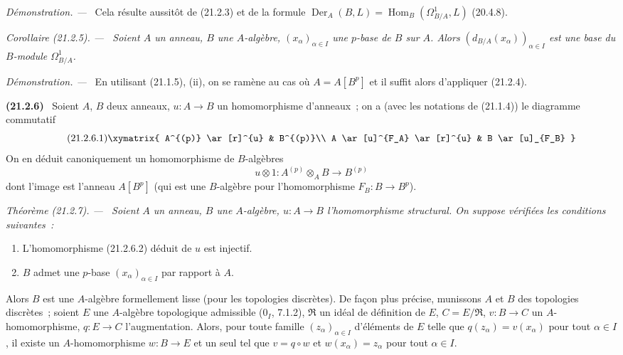 \documentclass[10pt,oneside]{book}
\makeatletter
\newcommand{\setmanualcurrentlabel}[1]{\def\@currentlabel{#1}}
\newcommand{\oldpage}[2][]{%
  \setcounter{footnote}{0}%
  \marginpar{\scriptsize\textbf{#1}~|~#2}\ignorespaces}
\newenvironment{env}[1][]{\setmanualcurrentlabel{#1}\par\medskip\noindent\textbf{(#1)}\ }{\par}
\newenvironment{theorem}[1][]{%
  \setmanualcurrentlabel{#1}\par\medskip\noindent\itshape Théorème (#1). ---\ }{\par}
\newenvironment{corollary}[1][]{%
  \setmanualcurrentlabel{#1}\par\medskip\noindent\itshape Corollaire (#1). ---\ }{\par}
\newenvironment{proof}{%
  \par\medskip\noindent\textit{Démonstration. ---\ }}{\par}
\makeatother
\begin{document}
\begin{proof}
Cela résulte aussitôt de (21.2.3) et de la formule
$\operatorname{Der}_A(B,L)=\operatorname{Hom}_B(\Omega^1_{B/A},L)$ (20.4.8).
\end{proof}

\begin{corollary}[21.2.5]
\label{0.21.2.5-fr}
Soient $A$ un anneau, $B$ une $A$-algèbre, $(x_\alpha)_{\alpha\in I}$ une
$p$-base de $B$ sur $A$. Alors $(d_{B/A}(x_\alpha))_{\alpha\in I}$ est une
base du $B$-module $\Omega^1_{B/A}$.
\end{corollary}

\begin{proof}
En utilisant (21.1.5), (ii), on se ramène au cas où $A=A[B^p]$ et il suffit
alors d'appliquer (21.2.4).
\end{proof}

\oldpage[0\textsubscript{IV-1}]{159}
\begin{env}[21.2.6]
\label{0.21.2.6-fr}
Soient $A$, $B$ deux anneaux, $u:A\to B$ un homomorphisme d'anneaux~; on a
(avec les notations de (21.1.4)) le diagramme commutatif
\begin{equation}
\tag{21.2.6.1}
\label{0.21.2.6.1-fr}
\xymatrix{
 A^{(p)} \ar[r]^{u} & B^{(p)}\\
 A \ar[u]^{F_A} \ar[r]^{u} & B \ar[u]_{F_B}
}
\end{equation}
On en déduit canoniquement un homomorphisme de $B$-algèbres
\begin{equation}
\tag{21.2.6.2}
\label{0.21.2.6.2-fr}
u\otimes1:A^{(p)}\otimes_A B\longrightarrow B^{(p)}
\end{equation}
dont l'image est l'anneau $A[B^p]$ (qui est une $B$-algèbre pour
l'homomorphisme $F_B:B\to B^p$).
\end{env}

\begin{theorem}[21.2.7]
\label{0.21.2.7-fr}
Soient $A$ un anneau, $B$ une $A$-algèbre, $u:A\to B$ l'homomorphisme
structural. On suppose vérifiées les conditions suivantes~:
\begin{enumerate}
  \item[(i)] L'homomorphisme (21.2.6.2) déduit de $u$ est injectif.
  \item[(ii)] $B$ admet une $p$-base $(x_\alpha)_{\alpha\in I}$ par rapport à $A$.
\end{enumerate}
Alors $B$ est une $A$-algèbre formellement lisse (pour les topologies
discrètes). De façon plus précise, munissons $A$ et $B$ des topologies
discrètes~; soient $E$ une $A$-algèbre topologique admissible
(0$_I$, 7.1.2), $\mathfrak R$ un idéal de définition de $E$, $C=E/\mathfrak R$,
$v:B\to C$ un $A$-homomorphisme, $q:E\to C$ l'augmentation. Alors, pour
toute famille $(z_\alpha)_{\alpha\in I}$ d'éléments de $E$ telle que
$q(z_\alpha)=v(x_\alpha)$ pour tout $\alpha\in I$, il existe un
$A$-homomorphisme $w:B\to E$ et un seul tel que $v=q\circ w$ et
$w(x_\alpha)=z_\alpha$ pour tout $\alpha\in I$.
\end{theorem}
\end{document}
